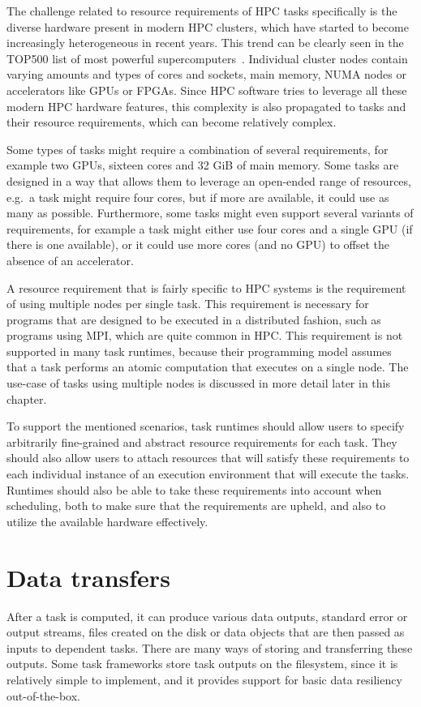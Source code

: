 The challenge related to resource requirements of HPC tasks specifically is the diverse hardware
present in modern HPC clusters, which have started to become increasingly heterogeneous in recent
years. This trend can be clearly seen in the TOP500 list of most powerful
supercomputers~\cite{top500analysis}. Individual cluster nodes contain varying amounts and
types of cores and sockets, main memory, NUMA nodes or accelerators like GPUs or FPGAs. Since HPC
software tries to leverage all these modern HPC hardware features, this complexity is also
propagated to tasks and their resource requirements, which can become relatively complex.

Some types of tasks might require a combination of several requirements, for example two GPUs,
sixteen cores and 32 GiB of main memory. Some tasks are designed in a way that allows them to
leverage an open-ended range of resources, e.g.\ a task might require four cores, but if more are
available, it could use as many as possible. Furthermore, some tasks might even support several
variants of requirements, for example a task might either use four cores and a single GPU (if there
is one available), or it could use more cores (and no GPU) to offset the absence of an accelerator.

A resource requirement that is fairly specific to HPC systems is the requirement of using multiple
nodes per single task. This requirement is necessary for programs that are designed to be executed
in a distributed fashion, such as programs using MPI, which are quite common in HPC. This
requirement is not supported in many task runtimes, because their programming model assumes that a
task performs an atomic computation that executes on a single node. The use-case of tasks using
multiple nodes is discussed in more detail later in this chapter.

To support the mentioned scenarios, task runtimes should allow users to specify arbitrarily
fine-grained and abstract resource requirements for each task. They should also allow users to
attach resources that will satisfy these requirements to each individual instance of an execution
environment that will execute the tasks. Runtimes should also be able to take these requirements
into account when scheduling, both to make sure that the requirements are upheld, and also to
utilize the available hardware effectively.

\section{Data transfers}
After a task is computed, it can produce various data outputs, standard error or output streams,
files created on the disk or data objects that are then passed as inputs to dependent tasks. There
are many ways of storing and transferring these outputs. Some task frameworks store task outputs on
the filesystem, since it is relatively simple to implement, and it provides support for basic data
resiliency out-of-the-box.

